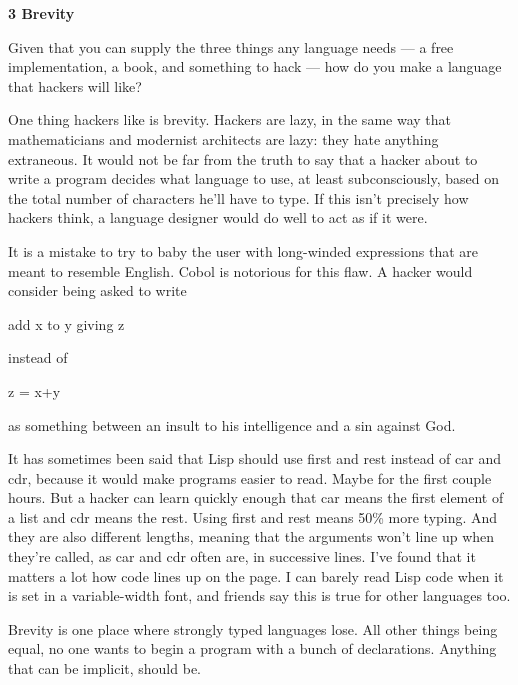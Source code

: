 \textbf{3 Brevity}

Given that you can supply the three things any
                  language needs --- a free implementation, a book, and
                  something to hack --- how do you make a language that
                  hackers will like?

One thing hackers like is
                  brevity. Hackers are lazy, in the same way that mathematicians
                  and modernist architects are lazy: they hate anything
                  extraneous. It would not be far from the truth to say that a
                  hacker about to write a program decides what language to use,
                  at least subconsciously, based on the total number of
                  characters he'll have to type. If this isn't precisely how
                  hackers think, a language designer would do well to act as if
                  it were.

It is a mistake to try to baby the user
                  with long-winded expressions that are meant to resemble
                  English. Cobol is notorious for this flaw. A hacker would
                  consider being asked to write

add x to y giving
                  z

instead of

z = x+y

as
                  something between an insult to his intelligence and a sin
                  against God.

It has sometimes been said that Lisp
                  should use first and rest instead of car and cdr, because it
                  would make programs easier to read. Maybe for the first couple
                  hours. But a hacker can learn quickly enough that car means
                  the first element of a list and cdr means the rest. Using
                  first and rest means 50\% more typing. And they are also
                  different lengths, meaning that the arguments won't line up
                  when they're called, as car and cdr often are, in successive
                  lines. I've found that it matters a lot how code lines up on
                  the page. I can barely read Lisp code when it is set in a
                  variable-width font, and friends say this is true for other
                  languages too.

Brevity is one place where strongly
                  typed languages lose. All other things being equal, no one
                  wants to begin a program with a bunch of declarations.
                  Anything that can be implicit, should be.

